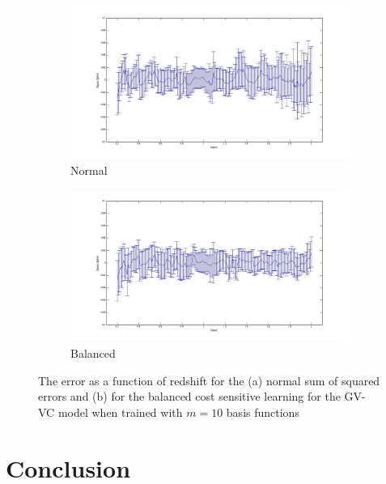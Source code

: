 \documentclass[useAMS,usenatbib,fleqn]{mn2e}
\begin{document}
\begin{figure}
        \centering
        \begin{subfigure}[b]{1\columnwidth}
                \includegraphics[trim = 35px 15px 50px 25px, clip=true,width=\textwidth]{Zspec-Zphot_normal.jpg}
                \caption{Normal}
                \label{fig-normal}
        \end{subfigure}

        \begin{subfigure}{1\columnwidth}
                \includegraphics[trim = 35px 15px 50px 25px, clip=true,width=\textwidth]{Zspec-Zphot_balanced.jpg}
                \caption{Balanced}
                \label{fig-balanced}
        \end{subfigure}
        
       \caption{The error as a function of redshift for the (a) normal sum of squared errors and (b) for the balanced cost sensitive learning for the GV-VC model when trained with $m=10$ basis functions}
	\label{fig-normal-balanced}
\end{figure}


\section{Conclusion}
\label{sec-conclusion}

\footnotesize{

	
}
\end{document}
